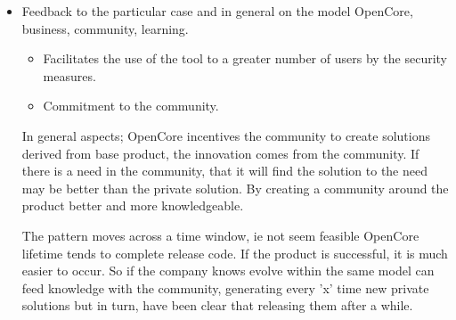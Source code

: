 \documentclass[11pt]{scrartcl}
\begin{document}
\begin{itemize}
\item Feedback to the particular case and in general on the model OpenCore, business, community, learning.

\begin{itemize}
    \item Facilitates the use of the tool to a greater number of users by the security measures.
    \item Commitment to the community.
\end{itemize}

\par In general aspects; OpenCore incentives the community to create solutions derived from base product, the innovation comes from the community. If there is a need in the community, that it will find the solution to the need may be better than the private solution. By creating a community around the product better and more knowledgeable.

\par The pattern moves across a time window, ie not seem feasible OpenCore lifetime tends to complete release code. If the product is successful, it is much easier to occur. So if the company knows evolve within the same model can feed knowledge with the community, generating every 'x' time new private solutions but in turn, have been clear that releasing them after a while.

\end{itemize}
\end{document}
